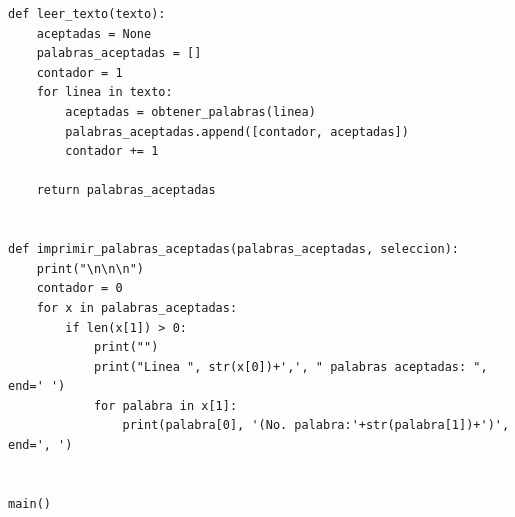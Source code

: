 \documentclass[12pt]{article}
\begin{document}
\begin{lstlisting}[frame=single]
def leer_texto(texto):
    aceptadas = None
    palabras_aceptadas = []
    contador = 1
    for linea in texto:
        aceptadas = obtener_palabras(linea)
        palabras_aceptadas.append([contador, aceptadas])
        contador += 1

    return palabras_aceptadas


def imprimir_palabras_aceptadas(palabras_aceptadas, seleccion):
    print("\n\n\n")
    contador = 0
    for x in palabras_aceptadas:
        if len(x[1]) > 0:
            print("")
            print("Linea ", str(x[0])+',', " palabras aceptadas: ", end=' ')
            for palabra in x[1]:
                print(palabra[0], '(No. palabra:'+str(palabra[1])+')', end=', ')


main()

\end{lstlisting}

\vspace{3em}
\end{document}
